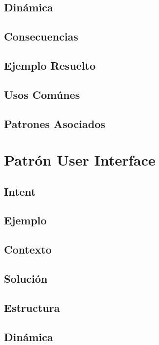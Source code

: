\subsection*{Dinámica}

\subsection*{Consecuencias}

\subsection*{Ejemplo Resuelto}

\subsection*{Usos Comúnes}

\subsection*{Patrones Asociados}

\newpage

\section{Patrón User Interface}
\label{chap4:UIPatt}
\subsection*{Intent}

\subsection*{Ejemplo}

\subsection*{Contexto}

\subsection*{Solución}

\subsection*{Estructura}

\subsection*{Dinámica}

